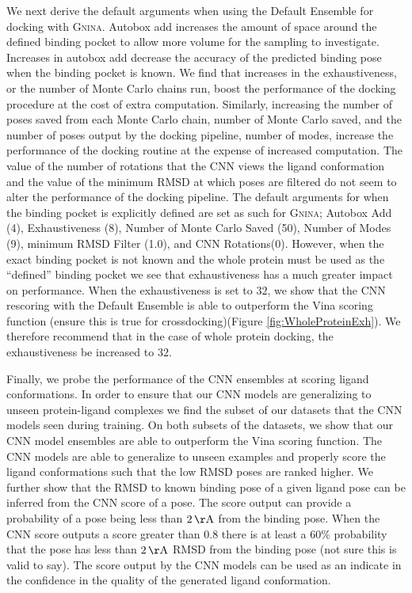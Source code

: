 \documentclass[journal=jcisd8,manuscript=article]{achemso}
\begin{document}
We next derive the default arguments when using the Default Ensemble for docking with \textsc{Gnina}. Autobox add increases the amount of space around the defined binding pocket to allow more volume for the sampling to investigate. Increases in autobox add decrease the accuracy of the predicted binding pose when the binding pocket is known. We find that increases in the exhaustiveness, or the number of Monte Carlo chains run, boost the performance of the docking procedure at the cost of extra computation. Similarly, increasing the number of poses saved from each Monte Carlo chain, number of Monte Carlo saved, and the number of poses output by the docking pipeline, number of modes, increase the performance of the docking routine at the expense of increased computation. The value of the number of rotations that the CNN views the ligand conformation and the value of the minimum RMSD at which poses are filtered do not seem to alter the performance of the docking pipeline. The default arguments for when the binding pocket is explicitly defined are set as such for \textsc{Gnina}; Autobox Add (4), Exhaustiveness (8), Number of Monte Carlo Saved (50), Number of Modes (9), minimum RMSD Filter (1.0), and CNN Rotations(0). However, when the exact binding pocket is not known and the whole protein must be used as the ``defined'' binding pocket we see that exhaustiveness has a much greater impact on performance. When the exhaustiveness is set to $32$, we show that the CNN rescoring with the Default Ensemble is able to outperform the Vina scoring function (ensure this is true for crossdocking)(Figure \ref{fig:WholeProteinExh}). We therefore recommend that in the case of whole protein docking, the exhaustiveness be increased to 32.

Finally, we probe the performance of the CNN ensembles at scoring ligand conformations. In order to ensure that our CNN models are generalizing to unseen protein-ligand complexes we find the subset of our datasets that the CNN models seen during training. On both subsets of the datasets, we show that our CNN model ensembles are able to outperform the Vina scoring function. The CNN models are able to generalize to unseen examples and properly score the ligand conformations such that the low RMSD poses are ranked higher. We further show that the RMSD to known binding pose of a given ligand pose can be inferred from the CNN score of a pose. The score output can provide a probability of a pose being less than $2\,\mathrm{\AA}$ from the binding pose. When the CNN score outputs a score greater than $0.8$ there is at least a $60\%$ probability that the pose has less than $2\,\mathrm{\AA}$ RMSD from the binding pose (not sure this is valid to say). The score output by the CNN models can be used as an indicate in the confidence in the quality of the generated ligand conformation.
\end{document}
